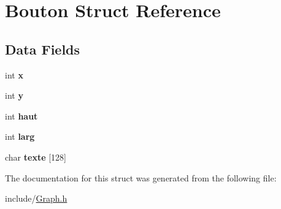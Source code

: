 \hypertarget{struct_bouton}{\section{Bouton Struct Reference}
\label{struct_bouton}
}
\subsection*{Data Fields}
\begin{DoxyCompactItemize}
\item 
\hypertarget{struct_bouton_a6150e0515f7202e2fb518f7206ed97dc}{int {\bfseries x}}\label{struct_bouton_a6150e0515f7202e2fb518f7206ed97dc}

\item 
\hypertarget{struct_bouton_a0a2f84ed7838f07779ae24c5a9086d33}{int {\bfseries y}}\label{struct_bouton_a0a2f84ed7838f07779ae24c5a9086d33}

\item 
\hypertarget{struct_bouton_aec6212c78e758f9e3d2b541a93fb48db}{int {\bfseries haut}}\label{struct_bouton_aec6212c78e758f9e3d2b541a93fb48db}

\item 
\hypertarget{struct_bouton_a26c7f893643801638ea4f8d9fdea6511}{int {\bfseries larg}}\label{struct_bouton_a26c7f893643801638ea4f8d9fdea6511}

\item 
\hypertarget{struct_bouton_a69245aaea6d5a2f3aa9392ca87a92b72}{char {\bfseries texte} \mbox{[}128\mbox{]}}\label{struct_bouton_a69245aaea6d5a2f3aa9392ca87a92b72}

\end{DoxyCompactItemize}


The documentation for this struct was generated from the following file\+:\begin{DoxyCompactItemize}
\item 
include/\hyperlink{_graph_8h}{Graph.\+h}\end{DoxyCompactItemize}
